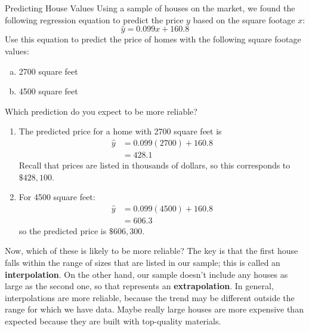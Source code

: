 \begin{example}[https://www.youtube.com/watch?v=1M-Czl8swv8&list=PLfmpjsIzhzttL_Uec2nCbDRcAcUF7NKG8&index=21]{Predicting House Values}
Using a sample of houses on the market, we found the following regression equation to predict the price $y$ based on the square footage $x$:
\[\hat{y} = 0.099x + 160.8\]
Use this equation to predict the price of homes with the following square footage values:
\begin{enumerate}[(a)]
\item 2700 square feet
\item 4500 square feet
\end{enumerate}
Which prediction do you expect to be more reliable?

\sol
\begin{enumerate}
\item The predicted price for a home with 2700 square feet is
\begin{align*}
\hat{y} &= 0.099(2700) + 160.8\\
&= 428.1
\end{align*}
Recall that prices are listed in thousands of dollars, so this corresponds to $\boxed{\$428,100}$.

\item For 4500 square feet:
\begin{align*}
\hat{y} &= 0.099(4500) + 160.8\\
&= 606.3
\end{align*}
so the predicted price is $\boxed{\$606,300}$.
\end{enumerate}

Now, which of these is likely to be more reliable?  The key is that the first house falls within the range of sizes that are listed in our sample; this is called an \textbf{interpolation}.  On the other hand, our sample doesn't include any houses as large as the second one, so that represents an \textbf{extrapolation}.  In general, interpolations are more reliable, because the trend may be different outside the range for which we have data.  Maybe really large houses are more expensive than expected because they are built with top-quality materials.
\end{example}

